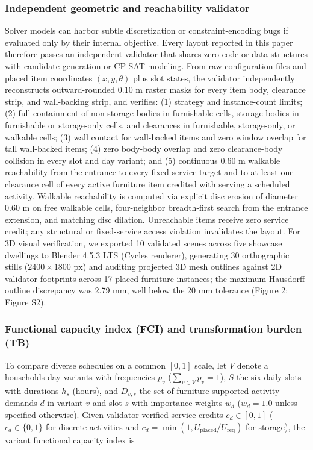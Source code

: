 \documentclass[12pt,letterpaper]{article}
\begin{document}
\subsubsection{Independent geometric and reachability validator}\label{independent-geometric-and-reachability-validator}

Solver models can harbor subtle discretization or constraint-encoding bugs if evaluated only by their internal objective. Every layout reported in this paper therefore passes an independent validator that shares zero code or data structures with candidate generation or CP-SAT modeling. From raw configuration files and placed item coordinates \((x, y, \theta)\) plus slot states, the validator independently reconstructs outward-rounded 0.10 m raster masks for every item body, clearance strip, and wall-backing strip, and verifies: (1) strategy and instance-count limits; (2) full containment of non-storage bodies in furnishable cells, storage bodies in furnishable or storage-only cells, and clearances in furnishable, storage-only, or walkable cells; (3) wall contact for wall-backed items and zero window overlap for tall wall-backed items; (4) zero body-body overlap and zero clearance-body collision in every slot and day variant; and (5) continuous 0.60 m walkable reachability from the entrance to every fixed-service target and to at least one clearance cell of every active furniture item credited with serving a scheduled activity. Walkable reachability is computed via explicit disc erosion of diameter \(0.60\text{ m}\) on free walkable cells, four-neighbor breadth-first search from the entrance extension, and matching disc dilation. Unreachable items receive zero service credit; any structural or fixed-service access violation invalidates the layout. For 3D visual verification, we exported 10 validated scenes across five showcase dwellings to Blender 4.5.3 LTS (Cycles renderer), generating 30 orthographic stills (\(2400 \times 1800\text{ px}\)) and auditing projected 3D mesh outlines against 2D validator footprints across 17 placed furniture instances; the maximum Hausdorff outline discrepancy was 2.79 mm, well below the 20 mm tolerance (Figure 2; Figure S2).

\subsubsection{Functional capacity index (FCI) and transformation burden (TB)}\label{functional-capacity-index-fci-and-transformation-burden-tb}

To compare diverse schedules on a common \([0, 1]\) scale, let \(V\) denote a household\textquotesingle s day variants with frequencies \(p_v\) (\(\sum_{v \in V} p_v = 1\)), \(S\) the six daily slots with durations \(h_s\) (hours), and \(D_{v,s}\) the set of furniture-supported activity demands \(d\) in variant \(v\) and slot \(s\) with importance weights \(w_d\) (\(w_d = 1.0\) unless specified otherwise). Given validator-verified service credits \(c_d \in [0, 1]\) (\(c_d \in \{0, 1\}\) for discrete activities and \(c_d = \min(1, U_{\text{placed}} / U_{\text{req}})\) for storage), the variant functional capacity index is
\end{document}
